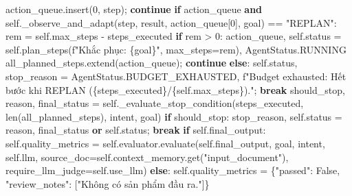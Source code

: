 \documentclass[]{article}
\newenvironment{Shaded}{}{}
\newcommand{\BuiltInTok}[1]{#1}
\newcommand{\ControlFlowTok}[1]{\textcolor[rgb]{0.00,0.44,0.13}{\textbf{#1}}}
\newcommand{\DecValTok}[1]{\textcolor[rgb]{0.25,0.63,0.44}{#1}}
\newcommand{\KeywordTok}[1]{\textcolor[rgb]{0.00,0.44,0.13}{\textbf{#1}}}
\newcommand{\NormalTok}[1]{#1}
\newcommand{\OperatorTok}[1]{\textcolor[rgb]{0.40,0.40,0.40}{#1}}
\newcommand{\SpecialCharTok}[1]{\textcolor[rgb]{0.25,0.44,0.63}{#1}}
\newcommand{\SpecialStringTok}[1]{\textcolor[rgb]{0.73,0.40,0.53}{#1}}
\newcommand{\StringTok}[1]{\textcolor[rgb]{0.25,0.44,0.63}{#1}}
\newcommand{\VariableTok}[1]{\textcolor[rgb]{0.10,0.09,0.49}{#1}}
\begin{document}
\begin{Shaded}
\begin{Highlighting}[fontsize=\scriptsize]
\NormalTok{                action_queue.insert(}\DecValTok{0}\NormalTok{, step)}\OperatorTok{;} \ControlFlowTok{continue}
            \ControlFlowTok{if}\NormalTok{ action_queue }\KeywordTok{and} \VariableTok{self}\NormalTok{._observe_and_adapt(step, result, action_queue[}\DecValTok{0}\NormalTok{], goal) }\OperatorTok{==} \StringTok{"REPLAN"}\NormalTok{:}
\NormalTok{                rem }\OperatorTok{=} \VariableTok{self}\NormalTok{.max_steps }\OperatorTok{-}\NormalTok{ steps_executed}
                \ControlFlowTok{if}\NormalTok{ rem }\OperatorTok{>} \DecValTok{0}\NormalTok{:}
\NormalTok{                    action_queue, }\VariableTok{self}\NormalTok{.status }\OperatorTok{=} \VariableTok{self}\NormalTok{.plan_steps(}\SpecialStringTok{f"Khắc phục: }\SpecialCharTok{\{}\NormalTok{goal}\SpecialCharTok{\}}\SpecialStringTok{"}\NormalTok{, max_steps}\OperatorTok{=}\NormalTok{rem), AgentStatus.RUNNING}
\NormalTok{                    all_planned_steps.extend(action_queue)}\OperatorTok{;} \ControlFlowTok{continue}
                \ControlFlowTok{else}\NormalTok{:}
                    \VariableTok{self}\NormalTok{.status, stop_reason }\OperatorTok{=}\NormalTok{ AgentStatus.BUDGET_EXHAUSTED, }\SpecialStringTok{f"Budget exhausted: Hết bước khi REPLAN (}\SpecialCharTok{\{}\NormalTok{steps_executed}\SpecialCharTok{\}}\SpecialStringTok{/}\SpecialCharTok{\{}\VariableTok{self}\NormalTok{.max_steps}\SpecialCharTok{\}}\SpecialStringTok{)."}\OperatorTok{;} \ControlFlowTok{break}
\NormalTok{            should_stop, reason, final_status }\OperatorTok{=} \VariableTok{self}\NormalTok{._evaluate_stop_condition(steps_executed, }\BuiltInTok{len}\NormalTok{(all_planned_steps), intent, goal)}
            \ControlFlowTok{if}\NormalTok{ should_stop:}
\NormalTok{                stop_reason, }\VariableTok{self}\NormalTok{.status }\OperatorTok{=}\NormalTok{ reason, final_status }\KeywordTok{or} \VariableTok{self}\NormalTok{.status}\OperatorTok{;} \ControlFlowTok{break}
        \ControlFlowTok{if} \VariableTok{self}\NormalTok{.final_output:}
            \VariableTok{self}\NormalTok{.quality_metrics }\OperatorTok{=} \VariableTok{self}\NormalTok{.evaluator.evaluate(}\VariableTok{self}\NormalTok{.final_output, goal, intent, }\VariableTok{self}\NormalTok{.llm, source_doc}\OperatorTok{=}\VariableTok{self}\NormalTok{.context_memory.get(}\StringTok{"input_document"}\NormalTok{), require_llm_judge}\OperatorTok{=}\VariableTok{self}\NormalTok{.use_llm)}
        \ControlFlowTok{else}\NormalTok{:}
            \VariableTok{self}\NormalTok{.quality_metrics }\OperatorTok{=}\NormalTok{ \{}\StringTok{"passed"}\NormalTok{: }\VariableTok{False}\NormalTok{, }\StringTok{"review_notes"}\NormalTok{: [}\StringTok{"Không có sản phẩm đầu ra."}\NormalTok{]\}}


\end{Highlighting}
\end{Shaded}
\end{document}
